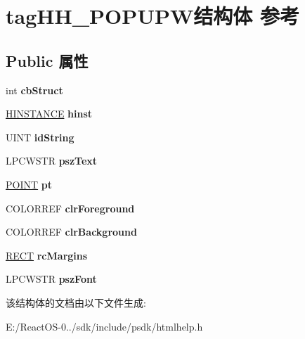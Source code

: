 \hypertarget{structtag_h_h___p_o_p_u_p_w}{}\section{tag\+H\+H\+\_\+\+P\+O\+P\+U\+P\+W结构体 参考}
\label{structtag_h_h___p_o_p_u_p_w}
\subsection*{Public 属性}
\begin{DoxyCompactItemize}
\item 
\mbox{\label{structtag_h_h___p_o_p_u_p_w_a3a3b47cd93e674bedc7ec85ecf9e6606}} 
int {\bfseries cb\+Struct}
\item 
\mbox{\label{structtag_h_h___p_o_p_u_p_w_a12e4e54c35d3cc248963c654472d3001}} 
\hyperlink{interfacevoid}{H\+I\+N\+S\+T\+A\+N\+CE} {\bfseries hinst}
\item 
\mbox{\label{structtag_h_h___p_o_p_u_p_w_ace3c529152f2542facb930f9133b7923}} 
U\+I\+NT {\bfseries id\+String}
\item 
\mbox{\label{structtag_h_h___p_o_p_u_p_w_ad909c09b282037f66bad3dba3a0e35c6}} 
L\+P\+C\+W\+S\+TR {\bfseries psz\+Text}
\item 
\mbox{\label{structtag_h_h___p_o_p_u_p_w_ab243ecc0a8f406840a28793564eeddb0}} 
\hyperlink{structtag_p_o_i_n_t}{P\+O\+I\+NT} {\bfseries pt}
\item 
\mbox{\label{structtag_h_h___p_o_p_u_p_w_abfa5f36f9fd6e3fd1f058616342e3deb}} 
C\+O\+L\+O\+R\+R\+EF {\bfseries clr\+Foreground}
\item 
\mbox{\label{structtag_h_h___p_o_p_u_p_w_aa2db2cf27b68613f7ac4f8acbb230144}} 
C\+O\+L\+O\+R\+R\+EF {\bfseries clr\+Background}
\item 
\mbox{\label{structtag_h_h___p_o_p_u_p_w_a637ed8af04ff38821f68dab055d25bf2}} 
\hyperlink{structtag_r_e_c_t}{R\+E\+CT} {\bfseries rc\+Margins}
\item 
\mbox{\label{structtag_h_h___p_o_p_u_p_w_a7c721dd3554dfff64dd6a39b02d4ad24}} 
L\+P\+C\+W\+S\+TR {\bfseries psz\+Font}
\end{DoxyCompactItemize}


该结构体的文档由以下文件生成\+:\begin{DoxyCompactItemize}
\item 
E\+:/\+React\+O\+S-\/0../sdk/include/psdk/htmlhelp.\+h\end{DoxyCompactItemize}
